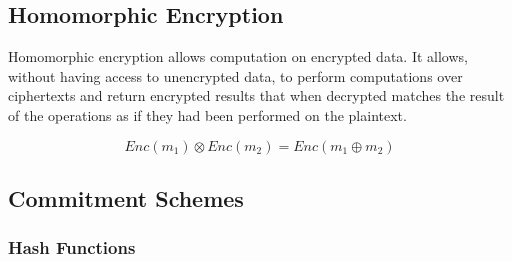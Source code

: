 \subsection{Homomorphic Encryption}
\label{preliminaries:crypto_block:homo}

Homomorphic encryption allows computation on encrypted data. It allows, without having access to unencrypted data, to perform computations over ciphertexts and return encrypted results that when decrypted matches the result of the operations as if they had been performed on the plaintext.

\begin{equation*}
  Enc(m_1) \otimes Enc(m_2) = Enc(m_1 \oplus m_2)
\end{equation*}

\subsection{Commitment Schemes}
\label{preliminaries:crypto_block:comm}

\subsubsection{Hash Functions}
\label{preliminaries:crypto_block:pub:comm:hash}
